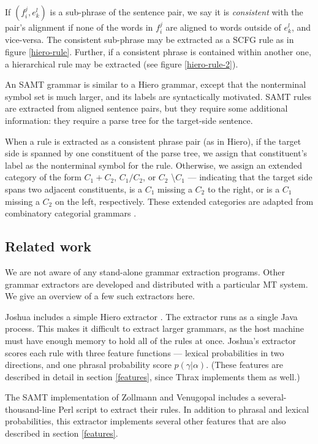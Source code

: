 \documentclass[11pt]{article}
\begin{document}
If $(f_i^j,e_k^l)$ is a sub-phrase of the sentence pair, we say it is {\em consistent} with the pair's alignment if none of the words in $f_i^j$ are aligned to words outside of $e_k^l$, and vice-versa. The consistent sub-phrase may be extracted as a SCFG rule as in figure \ref{hiero-rule}. Further, if a consistent phrase is contained within another one, a hierarchical rule may be extracted (see figure \ref{hiero-rule-2}).

An SAMT grammar \cite{samt2006} is similar to a Hiero grammar, except
that the nonterminal symbol set is much larger, and its labels are
syntactically motivated.  SAMT rules are extracted from aligned sentence pairs, but they require some additional information: they require a parse tree for the target-side sentence.

When a rule is extracted as a consistent phrase pair (as in Hiero), if the target side is spanned by one constituent of the parse tree, we assign that constituent's label as the nonterminal symbol for the rule. Otherwise, we assign an extended category of the form $C_1+C_2$, $C_1 / C_2$, or $C_2$ \textbackslash $C_1$ --- indicating that the target side spans two adjacent constituents, is a $C_1$ missing a $C_2$ to the right, or is a $C_1$ missing a $C_2$ on the left, respectively. These extended categories are adapted from combinatory categorial grammars \cite{Steedman1999}.

\subsection{Related work}

We are not aware of any stand-alone grammar extraction programs. Other grammar extractors are developed and distributed with a particular MT system. We give an overview of a few such extractors here.

Joshua includes a simple Hiero extractor \cite{schwartz2010}. The extractor runs as a single Java process. This makes it difficult to extract larger grammars, as the host machine must have enough memory to hold all of the rules at once. Joshua's extractor scores each rule with three feature functions --- lexical probabilities in two directions, and one phrasal probability score $p(\gamma|\alpha)$. (These features are described in detail in section \ref{features}, since Thrax implements them as well.) 

The SAMT implementation of Zollmann and Venugopal  includes a several-thousand-line Perl script to extract their rules. In addition to phrasal and lexical probabilities, this extractor implements several other features that are also described in section \ref{features}.
\end{document}
